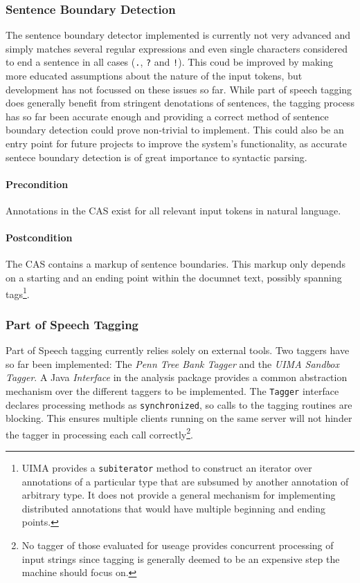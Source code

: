 \documentclass[12pt]{article}
\begin{document}
\subsubsection{Sentence Boundary Detection}

The sentence boundary detector implemented is currently not very advanced and
simply matches several regular expressions and even single characters considered
to end a sentence in all cases (\verb#.#, \verb#?# and \verb#!#). This coud be
improved by making more educated assumptions about the nature of the input
tokens, but development has not focussed on these issues so far. While part of speech
tagging does generally benefit from stringent denotations of sentences, the
tagging process has so far been accurate enough and 
providing a correct method of sentence boundary detection could prove
non-trivial to implement. This could also be an entry point for future projects
to improve the system's functionality, as accurate sentece boundary detection
is of great importance to syntactic parsing.

\paragraph{Precondition} Annotations in the CAS exist for all relevant input
tokens in natural language.
\paragraph{Postcondition} The CAS contains a markup of sentence boundaries. This
markup only depends on a starting and an ending point within the documnet text,
possibly spanning tags\footnote{UIMA provides a \texttt{subiterator} method to
construct an iterator over annotations of a particular type that are subsumed by
another annotation of arbitrary type. It does not provide a general mechanism
for implementing distributed annotations that would have multiple beginning and
ending points.}.

\subsubsection{Part of Speech Tagging}

Part of Speech tagging currently relies solely on external tools. Two taggers
have so far been implemented: The \emph{Penn Tree Bank Tagger} and the
\emph{UIMA Sandbox Tagger}. A Java \emph{Interface} in the analysis package
provides a common abstraction mechanism over the different taggers to be
implemented. The \verb#Tagger# interface declares processing methods as
\verb#synchronized#, so calls to the tagging routines are blocking. This ensures
multiple clients running on the same server will not hinder the tagger in
processing each call correctly\footnote{No tagger of those evaluated for useage
provides concurrent processing of input strings since tagging is generally
deemed to be an expensive step the machine should focus on.}.
\end{document}

